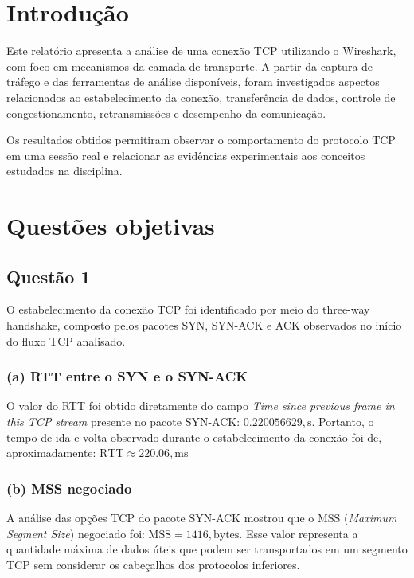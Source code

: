 \documentclass[
    12pt,
    a4paper,
    oneside
]{article}
\begin{document}
\section{Introdução}

Este relatório apresenta a análise de uma conexão TCP utilizando o Wireshark, com foco em mecanismos da camada de transporte. A partir da captura de tráfego e das ferramentas de análise disponíveis, foram investigados aspectos relacionados ao estabelecimento da conexão, transferência de dados, controle de congestionamento, retransmissões e desempenho da comunicação.

Os resultados obtidos permitiram observar o comportamento do protocolo TCP em uma sessão real e relacionar as evidências experimentais aos conceitos estudados na disciplina.

\section{Questões objetivas}


\subsection{Questão 1}
O estabelecimento da conexão TCP foi identificado por meio do three-way handshake, composto pelos pacotes SYN, SYN-ACK e ACK observados no início do fluxo TCP analisado.

\subsubsection*{(a) RTT entre o SYN e o SYN-ACK}

O valor do RTT foi obtido diretamente do campo \textit{Time since previous frame in this TCP stream} presente no pacote SYN-ACK: \(0.220056629,\mathrm{s}\). Portanto, o tempo de ida e volta observado durante o estabelecimento da conexão foi de, aproximadamente: \(\mathrm{RTT}\approx220.06,\mathrm{ms}\)

\subsubsection*{(b) MSS negociado}

A análise das opções TCP do pacote SYN-ACK mostrou que o MSS (\textit{Maximum Segment Size}) negociado foi: \(\mathrm{MSS}=1416,\mathrm{bytes}\). Esse valor representa a quantidade máxima de dados úteis que podem ser transportados em um segmento TCP sem considerar os cabeçalhos dos protocolos inferiores.
\end{document}
